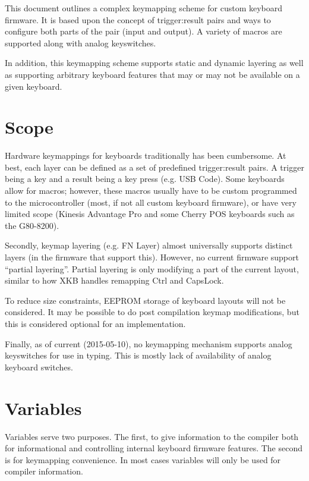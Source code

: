 \documentclass{kiibohd-template}
\begin{document}
This document outlines a complex keymapping scheme for custom keyboard firmware.
It is based upon the concept of trigger:result pairs and ways to configure both parts of the pair (input and output).
A variety of macros are supported along with analog keyswitches.

In addition, this keymapping scheme supports static and dynamic layering as well as supporting arbitrary keyboard features that may or may not be available on a given keyboard.


\chapter{Scope}

Hardware keymappings for keyboards traditionally has been cumbersome.
At best, each layer can be defined as a set of predefined trigger:result pairs.
A trigger being a key and a result being a key press (e.g. USB Code).
Some keyboards allow for macros; however, these macros usually have to be custom programmed to the microcontroller (most, if not all custom keyboard firmware), or have very limited scope (Kinesis Advantage Pro and some Cherry POS keyboards such as the G80-8200).

Secondly, keymap layering (e.g. FN Layer) almost universally supports distinct layers (in the firmware that support this).
However, no current firmware support ``partial layering''.
Partial layering is only modifying a part of the current layout, similar to how XKB handles remapping Ctrl and CapsLock.

To reduce size constraints, EEPROM storage of keyboard layouts will not be considered.
It may be possible to do post compilation keymap modifications, but this is considered optional for an implementation.

Finally, as of current (2015-05-10), no keymapping mechanism supports analog keyswitches for use in typing.
This is mostly lack of availability of analog keyboard switches.


\chapter{Variables}

Variables serve two purposes.
The first, to give information to the compiler both for informational and controlling internal keyboard firmware features.
The second is for keymapping convenience.
In most cases variables will only be used for compiler information.
\end{document}
